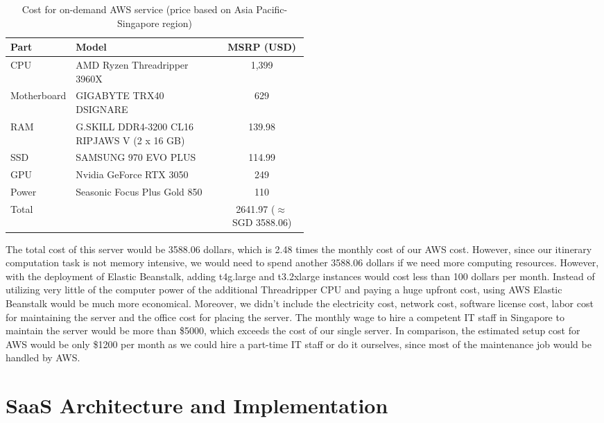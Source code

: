 \documentclass[a4paper]{article}
\begin{document}
\begin{table}[H]
	\centering
	\begin{tabular}{l|p{0.5\linewidth}|c}	%
	\hline \hline
	Part
	    & Model
	    & MSRP (USD)\\
		\hline
	CPU
		& AMD Ryzen Threadripper 3960X
		& 1,399 \\
	Motherboard
		& GIGABYTE TRX40 DSIGNARE
		& 629 \\
	RAM
	    & G.SKILL DDR4-3200 CL16 RIPJAWS V (2 x 16 GB)
    	& 139.98 \\
    SSD
        & SAMSUNG 970 EVO PLUS
        & 114.99 \\
    GPU
        & Nvidia GeForce RTX 3050
        & 249 \\
    Power
        & Seasonic Focus Plus Gold 850
        & 110 \\
    \hline
    Total
        &
        & 2641.97 ($\approx$ SGD 3588.06)\\
	\hline \hline
	\end{tabular}
	\caption{Cost for on-demand AWS service (price based on Asia Pacific-Singapore region)}
	\label{table_onpremise_it_resources}
\end{table}

The total cost of this server would be 3588.06 dollars, which is 2.48 times the monthly cost of our AWS cost. However, since our itinerary computation task is not memory intensive, we would need to spend another 3588.06 dollars if we need more computing resources. However, with the deployment of Elastic Beanstalk, adding t4g.large and t3.2xlarge instances would cost less than 100 dollars per month. Instead of utilizing very little of the computer power of the additional Threadripper CPU and paying a huge upfront cost, using AWS Elastic Beanstalk would be much more economical. Moreover, we didn’t include the electricity cost, network cost, software license cost, labor cost for maintaining the server and the office cost for placing the server. The monthly wage to hire a competent IT staff in Singapore to maintain the server would be more than \$5000, which exceeds the cost of our single server. In comparison, the estimated setup cost for AWS would be only \$1200 per month as we could hire a part-time IT staff or do it ourselves, since most of the maintenance job would be handled by AWS.

\section{SaaS Architecture and Implementation}
\end{document}

